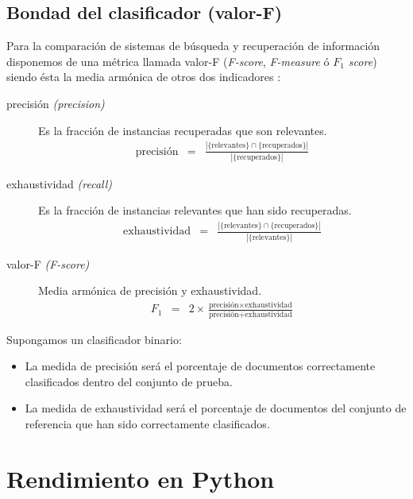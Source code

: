 \subsection{Bondad del clasificador (valor-F)}

Para la comparación de sistemas de búsqueda y recuperación de información disponemos de una métrica llamada valor-F (\emph{F-score}, \emph{F-measure} ó \emph{$F_1$ score}) siendo ésta la media armónica de otros dos indicadores \citep[Precisión y exhaustividad]{wikipedia-es}:
\begin{description}
\item[precisión \emph{(precision)}] 
Es la fracción de instancias recuperadas que son relevantes.
\begin{eqnarray}
\text{precisión} &=& \frac{|\{\text{relevantes}\}\cap\{\text{recuperados}\}|}{|\{\text{recuperados}\}|}
\end{eqnarray}
\item[exhaustividad \emph{(recall)}] 
Es la fracción de instancias relevantes que han sido recuperadas.
\begin{eqnarray}
\text{exhaustividad} &=& \frac{|\{\text{relevantes}\}\cap\{\text{recuperados}\}|}{|\{\text{relevantes}\}|}
\end{eqnarray}
\item[valor-F \emph{(F-score)}] Media armónica de precisión y exhaustividad.
\begin{eqnarray}
F_1 &=& 2\times\frac{\text{precisión}\times\text{exhaustividad}}{\text{precisión}+\text{exhaustividad}}
\end{eqnarray}
\end{description}

Supongamos un clasificador binario:
\begin{itemize}
\item La medida de precisión será el porcentaje de documentos correctamente clasificados dentro del conjunto de prueba.
\item La medida de exhaustividad será el porcentaje de documentos del conjunto de referencia que han sido correctamente clasificados. \citep{Perkins2010}
\end{itemize}


\section{Rendimiento en Python}

